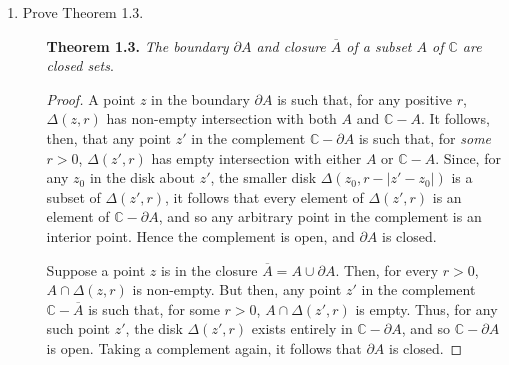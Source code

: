 \documentclass[12pt,a4paper]{article}
\newcommand{\C}{\mathbb{C}}
\begin{document}
\begin{enumerate}[label={\bfseries II.5.\arabic*}]
	\item Prove Theorem 1.3.
		\begin{enumerate}
			\item[\textbf{Theorem 1.3.}] \emph{The boundary $\partial A$ and closure $\overline A$ of a
			subset $A$ of $\C$ are closed sets}.
			\begin{proof}
				A point $z$ in the boundary $\partial A$ is such that, for any positive $r$, $\Delta(z, r)$
				has non-empty intersection with both $A$ and $\C - A$. It follows, then, that any point $z'$
				in the complement $\C - \partial A$ is such that, for \emph{some} $r > 0$, $\Delta(z', r)$
				has empty intersection with either $A$ or $\C - A$. Since, for any $z_0$ in	the disk about $z'$,
				the smaller disk $\Delta(z_0, r-|z'-z_0|)$ is a subset of $\Delta(z',r)$, it follows that every
				element of $\Delta(z', r)$ is an element of $\C - \partial A$, and so any arbitrary point in
				the complement is an interior point. Hence the complement is open, and $\partial A$ is closed.

				Suppose a point $z$ is in the closure $\overline A = A \cup \partial A$. Then, for every $r > 0$,
				$A \cap \Delta(z, r)$ is non-empty. But then, any point $z'$ in the complement $\C-\overline A$
				is such that, for some $r > 0$, $A \cap \Delta(z', r)$ is empty. Thus, for any such point $z'$,
				the disk $\Delta(z',r)$ exists entirely in $\C - \partial A$, and so $\C - \partial A$ is open.
				Taking a complement again, it follows that $\partial A$ is closed.
			\end{proof}
	\end{enumerate}


\end{enumerate}
\end{document}
